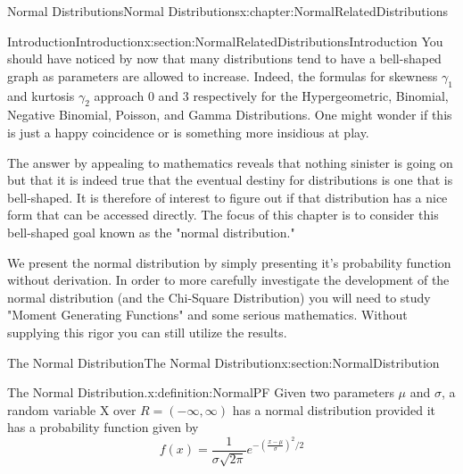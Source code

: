 \documentclass[oneside,10pt,]{book}
\numberwithin{equation}{section}
\begin{document}
%
%
\typeout{************************************************}
\typeout{************************************************}
%
\begin{chapterptx}{Normal Distributions}{}{Normal Distributions}{}{}{x:chapter:NormalRelatedDistributions}
%
%
\typeout{************************************************}
\typeout{************************************************}
%
\begin{sectionptx}{Introduction}{}{Introduction}{}{}{x:section:NormalRelatedDistributionsIntroduction}
You should have noticed by now that many distributions tend to have a bell-shaped graph as parameters are allowed to increase. Indeed, the formulas for skewness \(\gamma_1\) and kurtosis \(\gamma_2\) approach 0 and 3 respectively for the Hypergeometric, Binomial, Negative Binomial, Poisson, and Gamma Distributions. One might wonder if this is just a happy coincidence or is something more insidious at play.%
\par
The answer by appealing to mathematics reveals that nothing sinister is going on but that it is indeed true that the eventual destiny for distributions is one that is bell-shaped. It is therefore of interest to figure out if that distribution has a nice form that can be accessed directly. The focus of this chapter is to consider this bell-shaped goal known as the "normal distribution."%
\par
We present the normal distribution by simply presenting it's probability function without derivation. In order to more carefully investigate the development of the normal distribution (and the Chi-Square Distribution) you will need to study "Moment Generating Functions" and some serious mathematics. Without supplying this rigor you can still utilize the results.%
\end{sectionptx}
%
%
\typeout{************************************************}
\typeout{************************************************}
%
\begin{sectionptx}{The Normal Distribution}{}{The Normal Distribution}{}{}{x:section:NormalDistribution}
\begin{definition}{The Normal Distribution.}{x:definition:NormalPF}%
Given two parameters \(\mu\) and \(\sigma\), a random variable X over \(R = (-\infty,\infty)\) has a normal distribution provided it has a probability function given by%
\begin{equation*}
f(x) = \frac{1}{\sigma \sqrt{2 \pi}} e^{ -\left ( \frac{x-\mu}{\sigma} \right ) ^2 / 2}

\end{equation*}
\end{definition}
\end{sectionptx}
\end{chapterptx}
\end{document}

